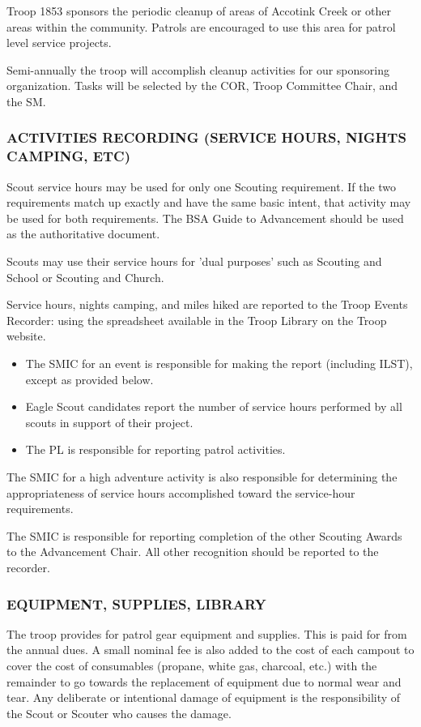 \documentclass{ltxguide}
\begin{document}
Troop 1853 sponsors the periodic cleanup of areas of Accotink Creek or other areas within the community. Patrols are encouraged to use this area for patrol level service projects.

Semi-annually the troop will accomplish cleanup activities for our sponsoring organization. Tasks will be selected by the \ac{COR}, Troop Committee Chair, and the \ac{SM}.

\subsubsection{ACTIVITIES RECORDING (SERVICE HOURS, NIGHTS CAMPING, ETC)}
Scout service hours may be used for only one Scouting requirement. If the two requirements match up exactly and have the same basic intent, that activity may be used for both requirements. The \ac{BSA} Guide to Advancement should be used as the authoritative document.

Scouts may use their service hours for 'dual purposes' such as Scouting and School or Scouting and Church.

Service hours, nights camping, and miles hiked are reported to the Troop Events Recorder: using the spreadsheet available in the Troop Library on the Troop website.

\begin{itemize}
	\item The SMIC for an event is responsible for making the report (including ILST), except as provided below.
	\item Eagle Scout candidates report the number of service hours performed by all scouts in support of their project.
	\item The \ac{PL} is responsible for reporting patrol activities.
\end{itemize}

The SMIC for a high adventure activity is also responsible for determining the appropriateness of service hours accomplished toward the service-hour requirements.

The SMIC is responsible for reporting completion of the other Scouting Awards to the Advancement Chair. All other recognition should be reported to the recorder.

\subsubsection{EQUIPMENT, SUPPLIES, LIBRARY}
The troop provides for patrol gear equipment and supplies. This is paid for from the annual dues. A small nominal fee is also added to the cost of each campout to cover the cost of consumables (propane, white gas, charcoal, etc.) with the remainder to go towards the replacement of equipment due to normal wear and tear. Any deliberate or intentional damage of equipment is the responsibility of the Scout or Scouter who causes the damage.
\end{document}
